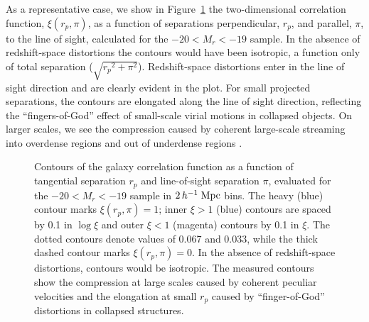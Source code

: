 \documentclass[]{emulateapj}
\newcommand{\hmpc}{\,h^{-1}\;{\rm Mpc}}
\newcommand{\xsirpi}{{\xi(r_p,\pi)}}
\begin{document}
As a representative case, we show in Figure~\ref{fig:xsirpi} the 
two-dimensional correlation function, $\xi(r_p,\pi)$,  as a function of 
separations perpendicular, $r_p$, and parallel, $\pi$, to the line of sight,
calculated for the $-20<M_r<-19$ sample.  In the absence of redshift-space 
distortions the contours would have been isotropic, a function only of 
total separation ($\sqrt{{r_p}^2+{\pi}^2}$).  Redshift-space distortions 
enter in the line of sight direction and are clearly evident in the plot.
For small projected separations, the contours are elongated along the 
line of sight direction, reflecting the ``fingers-of-God'' effect of
small-scale virial motions in collapsed objects. On larger scales,
we see the compression caused by coherent large-scale streaming
into overdense regions and out of underdense regions
\citep{sargent77,kaiser87}.

\begin{figure}[tbp]%
\caption[]{\label{fig:xsirpi}
Contours of the galaxy correlation function as a function of tangential
separation $r_p$ and line-of-sight separation $\pi$, evaluated for the
$-20<M_r<-19$ sample in $2\hmpc$ bins. The heavy (blue) contour marks 
$\xsirpi=1$; inner $\xi>1$ (blue) contours are spaced by 0.1 in $\log \xi$ and 
outer $\xi<1$ (magenta) contours by 0.1 in $\xi$.  The dotted contours denote
values of 0.067 and 0.033,  while the thick dashed contour marks 
$\xsirpi=0$. In the absence of redshift-space distortions, contours would
be isotropic.  The measured
contours show the compression at large scales caused by 
coherent peculiar velocities and the elongation at small $r_p$ caused 
by ``finger-of-God'' distortions in collapsed structures.  
}
\end{figure}
\end{document}
